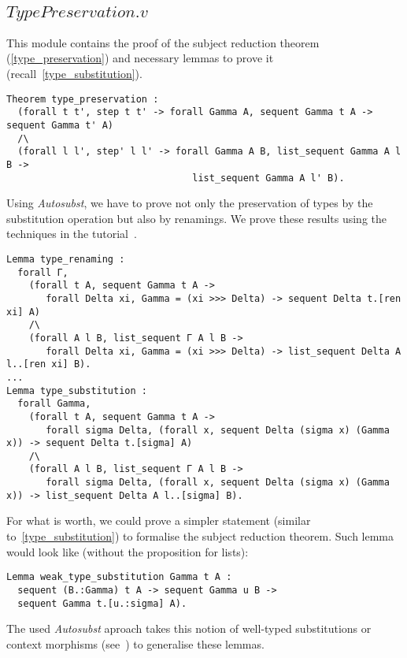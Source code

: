 \subsection{\lst$TypePreservation.v$}

This module contains the proof of the subject reduction theorem (\cref{type_preservation}) and necessary lemmas to prove it (recall~\cref{type_substitution}).

\begin{lstlisting}[language=Coq]
Theorem type_preservation :
  (forall t t', step t t' -> forall Gamma A, sequent Gamma t A -> sequent Gamma t' A)
  /\
  (forall l l', step' l l' -> forall Gamma A B, list_sequent Gamma A l B ->
                                 list_sequent Gamma A l' B).
\end{lstlisting}

Using \textit{Autosubst}, we have to prove not only the preservation of types by the substitution operation but also by renamings.
We prove these results using the techniques in the tutorial~\cite{AutosubstManual}.

\begin{lstlisting}[language=Coq]
Lemma type_renaming :
  forall Γ,
    (forall t A, sequent Gamma t A ->
       forall Delta xi, Gamma = (xi >>> Delta) -> sequent Delta t.[ren xi] A)
    /\
    (forall A l B, list_sequent Γ A l B ->
       forall Delta xi, Gamma = (xi >>> Delta) -> list_sequent Delta A l..[ren xi] B).
...
Lemma type_substitution :
  forall Gamma, 
    (forall t A, sequent Gamma t A ->
       forall sigma Delta, (forall x, sequent Delta (sigma x) (Gamma x)) -> sequent Delta t.[sigma] A)
    /\
    (forall A l B, list_sequent Γ A l B ->
       forall sigma Delta, (forall x, sequent Delta (sigma x) (Gamma x)) -> list_sequent Delta A l..[sigma] B).
\end{lstlisting}

For what is worth, we could prove a simpler statement (similar to~\cref{type_substitution}) to formalise the subject reduction theorem.
Such lemma would look like (without the proposition for lists):
\begin{lstlisting}[language=Coq]
Lemma weak_type_substitution Gamma t A :
  sequent (B.:Gamma) t A -> sequent Gamma u B ->
  sequent Gamma t.[u.:sigma] A).
\end{lstlisting}

The used \textit{Autosubst} aproach takes this notion of well-typed substitutions or context morphisms (see~\cite[Chapter~4]{AutosubstSchafer}) to generalise these lemmas.

